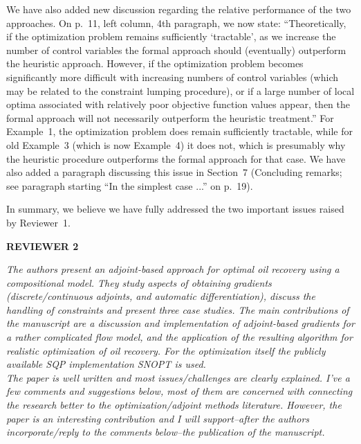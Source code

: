 \documentclass{article}
\begin{document}
We have also added new discussion regarding the relative performance of the two approaches. On p.~11, left column, 4th paragraph, we now state: ``Theoretically, if the optimization problem remains sufficiently `tractable', as we increase the number of control variables the formal approach should (eventually) outperform the heuristic approach. However, if the optimization problem becomes significantly more difficult with increasing numbers of control variables (which may be related to the constraint lumping procedure), or if a large number of local optima associated with relatively poor objective function values appear, then the formal approach will not necessarily outperform the heuristic treatment.'' For Example~1, the optimization problem does remain sufficiently tractable, while for old Example~3 (which is now Example~4) it does not, which is presumably why the heuristic procedure outperforms the formal approach for that case. We have also added a paragraph discussing this issue in Section~7 (Concluding remarks; see paragraph starting ``In the simplest case ...'' on p.~19).

In summary, we believe we have fully addressed the two important issues raised by Reviewer~1.

\vspace{10pt}


{\bf REVIEWER 2}

   {\it The authors present an adjoint-based approach for optimal oil recovery
   using a compositional model. They study aspects of obtaining gradients
   (discrete/continuous adjoints, and automatic differentiation), discuss
   the handling of constraints and present three case studies.  The main
   contributions of the manuscript are a discussion and implementation of
   adjoint-based gradients for a rather complicated flow model, and the
   application of the resulting algorithm for realistic optimization of
   oil recovery. For the optimization itself the publicly available SQP
   implementation SNOPT is used.
\\
   The paper is well written and most issues/challenges are clearly
   explained. I've a few comments and suggestions below, most of them are
   concerned with connecting the research better to the
   optimization/adjoint methods literature. However, the paper is an
   interesting contribution and I will support--after the authors
   incorporate/reply to the comments below--the publication of the
   manuscript.}
\end{document}
